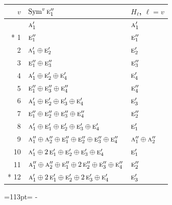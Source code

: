 \documentclass[10pt,a4paper]{article}
\newcommand{\needspace}[1]{\par\penalty-100\begingroup\dimen0=#1\relax\dimen2=\pagegoal
  \advance\dimen2-\pagetotal\ifdim\dimen0>\dimen2\relax\ifdim\dimen2>0pt\vfil\break\fi\fi
  \endgroup}
\numberwithin{equation}{section}
\newcommand{\irr}[1]{\text{\normalfont\scshape #1}}
\begin{document}
{\small\begin{longtable}{@{}rll@{}}\toprule
$v$ & $\operatorname{Sym}^{v}\irr{e}_{1}''$ & $H_\ell$, $\ell = v$\\\midrule\endhead
\bottomrule\endfoot\endlastfoot
0 & $\irr{a}_{1}'$ & $\irr{a}_{1}'$\\*
1 & $\irr{e}_{1}''$ & $\irr{e}_{1}''$\\
2 & $\irr{a}_{1}' \oplus \irr{e}_{2}'$ & $\irr{e}_{2}'$\\
3 & $\irr{e}_{1}'' \oplus \irr{e}_{3}''$ & $\irr{e}_{3}''$\\
4 & $\irr{a}_{1}' \oplus \irr{e}_{2}' \oplus \irr{e}_{4}'$ & $\irr{e}_{4}'$\\
5 & $\irr{e}_{1}'' \oplus \irr{e}_{3}'' \oplus \irr{e}_{4}''$ & $\irr{e}_{4}''$\\
6 & $\irr{a}_{1}' \oplus \irr{e}_{2}' \oplus \irr{e}_{3}' \oplus \irr{e}_{4}'$ & $\irr{e}_{3}'$\\
7 & $\irr{e}_{1}'' \oplus \irr{e}_{2}'' \oplus \irr{e}_{3}'' \oplus \irr{e}_{4}''$ & $\irr{e}_{2}''$\\
8 & $\irr{a}_{1}' \oplus \irr{e}_{1}' \oplus \irr{e}_{2}' \oplus \irr{e}_{3}' \oplus \irr{e}_{4}'$ & $\irr{e}_{1}'$\\
9 & $\irr{a}_{1}'' \oplus \irr{a}_{2}'' \oplus \irr{e}_{1}'' \oplus \irr{e}_{2}'' \oplus \irr{e}_{3}'' \oplus \irr{e}_{4}''$ & $\irr{a}_{1}'' \oplus \irr{a}_{2}''$\\
10 & $\irr{a}_{1}' \oplus 2\,\irr{e}_{1}' \oplus \irr{e}_{2}' \oplus \irr{e}_{3}' \oplus \irr{e}_{4}'$ & $\irr{e}_{1}'$\\
11 & $\irr{a}_{1}'' \oplus \irr{a}_{2}'' \oplus \irr{e}_{1}'' \oplus 2\,\irr{e}_{2}'' \oplus \irr{e}_{3}'' \oplus \irr{e}_{4}''$ & $\irr{e}_{2}''$\\*
12 & $\irr{a}_{1}' \oplus 2\,\irr{e}_{1}' \oplus \irr{e}_{2}' \oplus 2\,\irr{e}_{3}' \oplus \irr{e}_{4}'$ & $\irr{e}_{3}'$\\
\bottomrule\end{longtable}}
\needspace{113pt}
\end{document}
